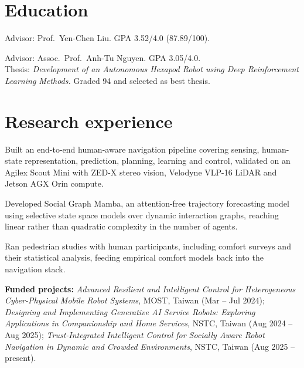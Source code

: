 \documentclass[10pt]{article}
\begin{document}
\section{Education}

\begin{detail}
Advisor: Prof.\ Yen-Chen Liu. \quad GPA 3.52/4.0 (87.89/100).
\end{detail}

\begin{detail}
Advisor: Assoc.\ Prof.\ Anh-Tu Nguyen. \quad GPA 3.05/4.0.\\
Thesis: \emph{Development of an Autonomous Hexapod Robot using Deep
Reinforcement Learning Methods.} Graded 94 and selected as best thesis.
\end{detail}

\section{Research experience}

\begin{achievements}
  \item Built an end-to-end human-aware navigation pipeline covering sensing,
        human-state representation, prediction, planning, learning and control,
        validated on an Agilex Scout Mini with ZED-X stereo vision, Velodyne
        VLP-16 LiDAR and Jetson AGX Orin compute.
  \item Developed Social Graph Mamba, an attention-free trajectory forecasting
        model using selective state space models over dynamic interaction graphs,
        reaching linear rather than quadratic complexity in the number of agents.
  \item Ran pedestrian studies with human participants, including comfort surveys
        and their statistical analysis, feeding empirical comfort models back into
        the navigation stack.
\end{achievements}
\begin{detail}
{\fontsize{9}{11.5}\selectfont\textbf{Funded projects:} \emph{Advanced Resilient and
Intelligent Control for Heterogeneous Cyber-Physical Mobile Robot Systems}, MOST,
Taiwan (Mar -- Jul 2024); \emph{Designing and Implementing Generative AI Service
Robots: Exploring Applications in Companionship and Home Services}, NSTC, Taiwan
(Aug 2024 -- Aug 2025); \emph{Trust-Integrated Intelligent Control for Socially
Aware Robot Navigation in Dynamic and Crowded Environments}, NSTC, Taiwan
(Aug 2025 -- present).}
\end{detail}
\end{document}
